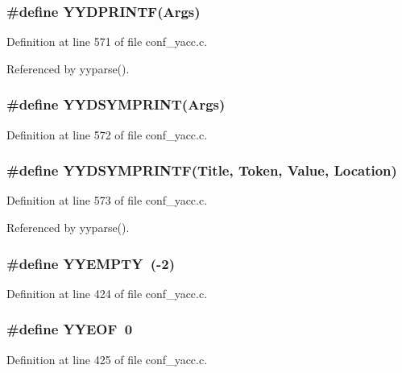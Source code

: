 \subsubsection{\setlength{\rightskip}{0pt plus 5cm}\#define YYDPRINTF(Args)}\label{conf__yacc_8c_a51}




Definition at line 571 of file conf\_\-yacc.c.

Referenced by yyparse().
\subsubsection{\setlength{\rightskip}{0pt plus 5cm}\#define YYDSYMPRINT(Args)}\label{conf__yacc_8c_a52}




Definition at line 572 of file conf\_\-yacc.c.
\subsubsection{\setlength{\rightskip}{0pt plus 5cm}\#define YYDSYMPRINTF(Title, Token, Value, Location)}\label{conf__yacc_8c_a53}




Definition at line 573 of file conf\_\-yacc.c.

Referenced by yyparse().
\subsubsection{\setlength{\rightskip}{0pt plus 5cm}\#define YYEMPTY\ (-2)}\label{conf__yacc_8c_a39}




Definition at line 424 of file conf\_\-yacc.c.
\subsubsection{\setlength{\rightskip}{0pt plus 5cm}\#define YYEOF\ 0}\label{conf__yacc_8c_a40}




Definition at line 425 of file conf\_\-yacc.c.
